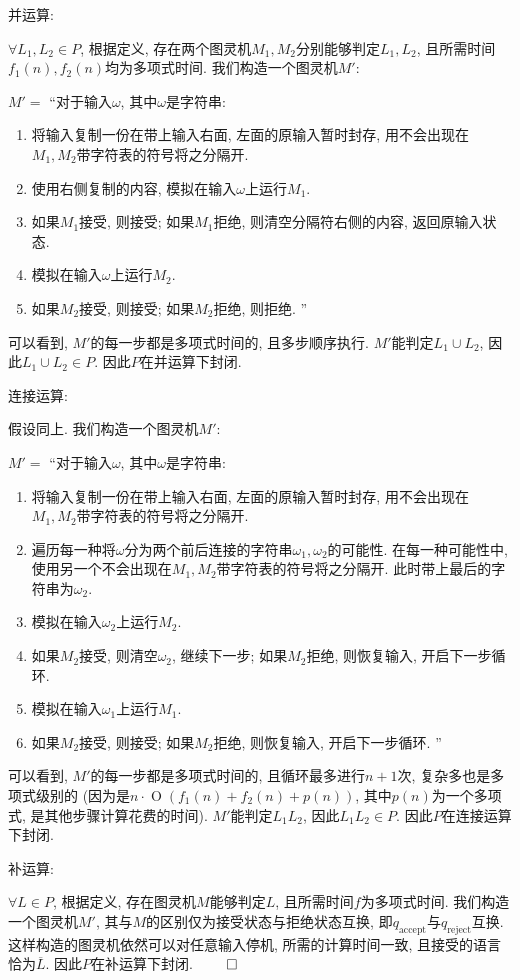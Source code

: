 \documentclass[UTF8]{report}
\renewenvironment{proof}{{\setlength{\parskip}{7pt}\noindent\hskip 2em \bf 证明 \quad}}{\hfill$\qed$\par}
\begin{document}
\begin{proof}
    并运算:

    $\forall L_1,L_2 \in P$, 根据定义, 存在两个图灵机$M_1,M_2$分别能够判定$L_1,L_2$, 且所需时间$f_1(n), f_2(n)$均为多项式时间. 我们构造一个图灵机$M'$:
    
    $M' =$ ``对于输入$\omega$, 其中$\omega$是字符串:
    \begin{enumerate}
        \item 将输入复制一份在带上输入右面, 左面的原输入暂时封存, 用不会出现在$M_1, M_2$带字符表的符号将之分隔开.
        \item 使用右侧复制的内容, 模拟在输入$\omega$上运行$M_1$.
        \item 如果$M_1$接受, 则接受; 如果$M_1$拒绝, 则清空分隔符右侧的内容, 返回原输入状态.
        \item 模拟在输入$\omega$上运行$M_2$.
        \item 如果$M_2$接受, 则接受; 如果$M_2$拒绝, 则拒绝.
        ''
    \end{enumerate}

    可以看到, $M'$的每一步都是多项式时间的, 且多步顺序执行. $M'$能判定$L_1\cup L_2$, 因此$L_1\cup L_2 \in P$. 因此$P$在并运算下封闭.

    连接运算:

    假设同上. 我们构造一个图灵机$M'$:
    
    $M' =$ ``对于输入$\omega$, 其中$\omega$是字符串:
    \begin{enumerate}
        \item 将输入复制一份在带上输入右面, 左面的原输入暂时封存, 用不会出现在$M_1, M_2$带字符表的符号将之分隔开.
        \item 遍历每一种将$\omega$分为两个前后连接的字符串$\omega_1, \omega_2$的可能性. 在每一种可能性中, 使用另一个不会出现在$M_1, M_2$带字符表的符号将之分隔开. 此时带上最后的字符串为$\omega_2$.
        \item 模拟在输入$\omega_2$上运行$M_2$.
        \item 如果$M_2$接受, 则清空$\omega_2$, 继续下一步; 如果$M_2$拒绝, 则恢复输入, 开启下一步循环.
        \item 模拟在输入$\omega_1$上运行$M_1$.
        \item 如果$M_2$接受, 则接受; 如果$M_2$拒绝, 则恢复输入, 开启下一步循环.
        ''
    \end{enumerate}

    可以看到, $M'$的每一步都是多项式时间的, 且循环最多进行$n+1$次, 复杂多也是多项式级别的 (因为是$n\cdot \operatorname{O}(f_1(n) + f_2(n) + p(n))$, 其中$p(n)$为一个多项式, 是其他步骤计算花费的时间). $M'$能判定$L_1 L_2$, 因此$L_1L_2 \in P$. 因此$P$在连接运算下封闭.

    补运算:

    $\forall L \in P$, 根据定义, 存在图灵机$M$能够判定$L$, 且所需时间$f$为多项式时间. 我们构造一个图灵机$M'$, 其与$M$的区别仅为接受状态与拒绝状态互换, 即$q_{\mathrm{accept}}$与$q_{\mathrm{reject}}$互换. 这样构造的图灵机依然可以对任意输入停机, 所需的计算时间一致, 且接受的语言恰为$\overline{L}$. 因此$P$在补运算下封闭.
\end{proof}
\end{document}

